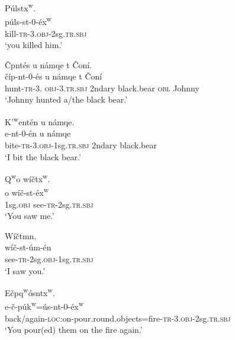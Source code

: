 \documentclass[output=paper,colorlinks,citecolor=brown]{langscibook}
\begin{document}
\ea
\label{ex-thomason-1}
\glll P\'ulstx\textsuperscript w.\\
      p\'uls-st-0-\'ex\textsuperscript w\\
      kill-\textsc{tr}-3.\textsc{obj}-2sg.\textsc{tr.sbj}\\
\glt `you killed him.'
\z


\ea
\label{ex-thomason-2}
\v{C}{\textltilde}pnt\'es {\textltilde}u n\textltilde\'amqe t \v{C}on\'i.\\
\gll \v{c}\textltilde\'ip-nt-0-\'es  {\textltilde}u n\textltilde\'amqe t \v{C}on\'i\\
     hunt-\textsc{tr}-3.\textsc{  obj}-3.\textsc{tr.sbj} 2ndary black.bear \textsc{obl} Johnny\\
\glt `Johnny hunted a/the black bear.'
\z

\ea 
\label{ex-thomason-3}
{K'\textsuperscript w}e{\textglotstop}nt\'en {\textltilde}u n\textltilde\'amqe.\\
e\textglotstop-nt-0-\'en             {\textltilde}u  n\textltilde\'amqe\\
     bite-\textsc{tr}-3.\textsc{obj}-1sg.\textsc{tr.sbj} 2ndary          black.bear\\
\glt `I bit the black bear.'
\z

\ea
\label{ex-thomason-4}
{Q\textsuperscript w}o w\'i\v{c}tx\textsuperscript w.\\
o w\'i\v{c}-st-\'ex\textsuperscript w\\
     1sg.\textsc{obj}       see-\textsc{tr}-2sg.\textsc{tr.sbj}\\  
\glt `You saw me.'
\z

\ea 
\label{ex-thomason-5}
W\'i\v{c}tmn.\\
\gll w\'i\v{c}-st-\'um-\'en\\
     see-\textsc{tr}-2sg.\textsc{obj}-1sg.\textsc{tr.sbj}\\
\glt `I saw you.'
\z

\ea 
\label{ex-thomason-6}
E\textltilde\v{c}pq\textsuperscript w\'osntx\textsuperscript w.\\
\gll e\textltilde-\v{c}-p\'uk\textsuperscript w=\'us-nt-0-\'ex\textsuperscript w\\
     back/again-\textsc{loc:}on-pour.round.objects=fire-\textsc{tr}-3.\textsc{obj}-2sg.\textsc{tr.sbj}\\  
\glt `You pour(ed) them on the fire again.'
\z
\end{document}
